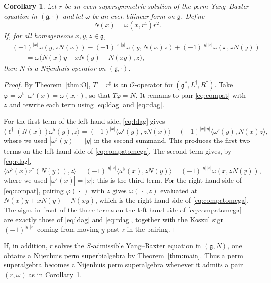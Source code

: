 \documentclass[11pt]{article}
\newtheorem{corollary}[theorem]{Corollary}
\theoremstyle{definition}
\newcommand{\g}{\mathfrak{g}}
\newcommand{\lr}[1]{\langle #1\rangle}
\begin{document}
\begin{corollary}\label{cor:construct}
Let $r$ be an even supersymmetric solution of the perm Yang--Baxter equation in $(\g,\cdot)$ and let $\omega$ be an even bilinear form on $\g$. Define
\[
N(x)=\omega(x,r^1)r^2.
\]
If, for all homogeneous $x,y,z\in\g$,
\begin{equation}\label{eq:compatomega}
\begin{split}
&(-1)^{|x|}\omega(y,zN(x))-(-1)^{|x||y|}\omega(y,N(x)z)
+(-1)^{|y||z|}\omega(x,zN(y))\\
&\qquad=\omega\bigl(N(x)y+xN(y)-N(xy),z\bigr),
\end{split}
\end{equation}
then $N$ is a Nijenhuis operator on $(\g,\cdot)$.
\end{corollary}
\begin{proof}
By Theorem~\ref{thm:O}, $T=r^\sharp$ is an $\mathcal O$-operator for $(\g^*,L^\dagger,R^\dagger)$. Take $\varphi=\omega^\flat$, $\omega^\flat(x)=\omega(x,\cdot)$, so that $T\varphi=N$. It remains to pair \eqref{eq:compat} with $z$ and rewrite each term using \eqref{eq:ldag} and \eqref{eq:rdag}.

For the first term of the left-hand side, \eqref{eq:ldag} gives
\[
\lr{\ell^\dagger(N(x))\omega^\flat(y),z}
=(-1)^{|x|}\lr{\omega^\flat(y),zN(x)}
-(-1)^{|x||y|}\lr{\omega^\flat(y),N(x)z},
\]
where we used $|\omega^\flat(y)|=|y|$ in the second summand. This produces the first two terms on the left-hand side of \eqref{eq:compatomega}. The second term gives, by \eqref{eq:rdag},
\[
\lr{\omega^\flat(x)r^\dagger(N(y)),z}
=(-1)^{|y||z|}\lr{\omega^\flat(x),zN(y)}
=(-1)^{|y||z|}\omega(x,zN(y)),
\]
where we used $|\omega^\flat(x)|=|x|$; this is the third term. For the right-hand side of \eqref{eq:compat}, pairing $\varphi(\,\cdot\,)$ with $z$ gives $\omega(\,\cdot\,,z)$ evaluated at $N(x)y+xN(y)-N(xy)$, which is the right-hand side of \eqref{eq:compatomega}. The signs in front of the three terms on the left-hand side of \eqref{eq:compatomega} are exactly those of \eqref{eq:ldag} and \eqref{eq:rdag}, together with the Koszul sign $(-1)^{|y||z|}$ coming from moving $y$ past $z$ in the pairing.
\end{proof}

If, in addition, $r$ solves the $S$-admissible Yang--Baxter equation in $(\g,N)$, one obtains a Nijenhuis perm superbialgebra by Theorem~\ref{thm:main}. Thus a perm superalgebra becomes a Nijenhuis perm superalgebra whenever it admits a pair $(r,\omega)$ as in Corollary~\ref{cor:construct}.
\end{document}
